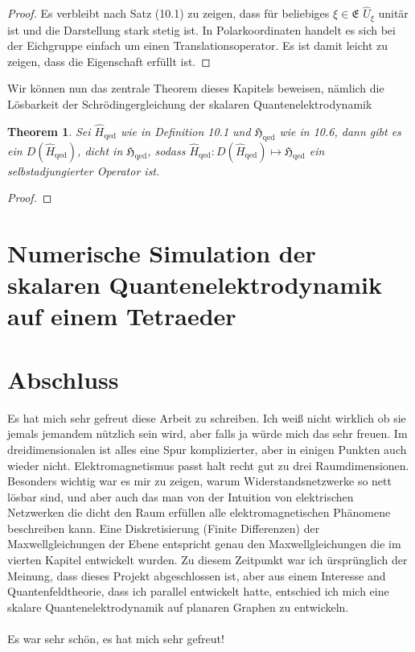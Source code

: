\documentclass[11pt,a4paper,leqno]{report}
\newtheorem{theorem}{Theorem}[chapter]
\numberwithin{equation}{chapter}
\begin{document}
\begin{proof}
Es verbleibt nach Satz (10.1) zu zeigen, dass f\"ur beliebiges $\xi\in\mathfrak{E}$ $\hat{U}_\xi$ unit\"ar ist und die Darstellung stark stetig ist. In Polarkoordinaten handelt es sich bei der Eichgruppe einfach um einen Translationsoperator. Es ist damit leicht zu zeigen, dass die Eigenschaft erf\"ullt ist.
\end{proof}
\noindent
Wir können nun das zentrale Theorem dieses Kapitels beweisen, n\"amlich die L\"osbarkeit der Schr\"odingergleichung der skalaren Quantenelektrodynamik
\begin{theorem}
	Sei $\hat{H}_\text{qed}$ wie in Definition 10.1 und $\mathfrak{H}_\text{qed}$ wie in 10.6, dann gibt es ein $D(\hat{H}_\text{qed})$, dicht in $\mathfrak{H}_\text{qed}$, sodass $\hat{H}_\text{qed}:D(\hat{H}_\text{qed})\mapsto\mathfrak{H}_\text{qed}$ ein selbstadjungierter Operator ist.
\end{theorem}
\begin{proof}
\end{proof}
\noindent
\chapter{Numerische Simulation der skalaren Quantenelektrodynamik auf einem Tetraeder}
\chapter*{Abschluss}
Es hat mich sehr gefreut diese Arbeit zu schreiben. Ich wei\ss{} nicht wirklich ob sie jemals jemandem n\"utzlich sein wird, aber falls ja w\"urde mich das sehr freuen. Im dreidimensionalen ist alles eine Spur komplizierter, aber in einigen Punkten auch wieder nicht. Elektromagnetismus passt halt recht gut zu drei Raumdimensionen. Besonders wichtig war es mir zu zeigen, warum Widerstandsnetzwerke so nett l\"osbar sind, und aber auch das man von der Intuition von elektrischen Netzwerken die dicht den Raum erf\"ullen alle elektromagnetischen Ph\"anomene beschreiben kann. Eine Diskretisierung (Finite Differenzen) der Maxwellgleichungen der Ebene entspricht genau den Maxwellgleichungen die im vierten Kapitel entwickelt wurden. Zu diesem Zeitpunkt war ich \"urspr\"unglich der Meinung, dass dieses Projekt abgeschlossen ist, aber aus einem Interesse and Quantenfeldtheorie, dass ich parallel entwickelt hatte, entschied ich mich eine skalare Quantenelektrodynamik auf planaren Graphen zu entwickeln.\\
\\
Es war sehr sch\"on, es hat mich sehr gefreut!
\end{document}
